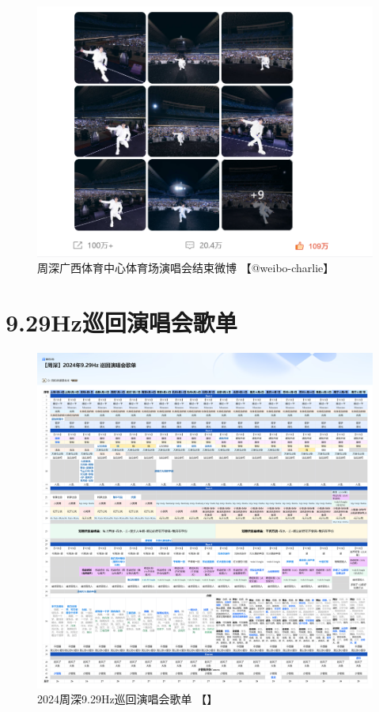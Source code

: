 \documentclass[]{ctexbook}
\begin{document}
\begin{figure}

{\centering \includegraphics{img/weibo/nanning-20241207-2} 

}

\caption{周深广西体育中心体育场演唱会结束微博 【@weibo-charlie】}\label{fig:unnamed-chunk-143}
\end{figure}

\appendix {}


\chapter{9.29Hz巡回演唱会歌单}\label{playlists}

\begin{figure}
\centering
\includegraphics{img/playlists/playlists.png}
\caption{\label{fig:unnamed-chunk-145}2024周深9.29Hz巡回演唱会歌单 【\citet{929hz-playlists}】}
\end{figure}
\end{document}
